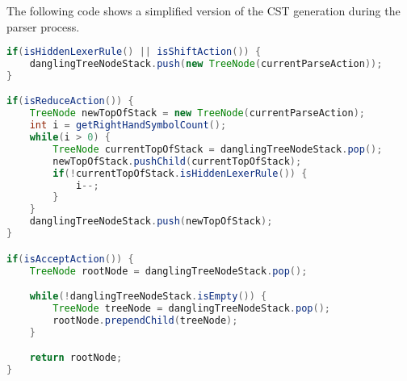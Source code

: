 The following code shows a simplified version of the CST generation during the parser process.
\begin{lstlisting}[language=Java, caption=CST Generation]
if(isHiddenLexerRule() || isShiftAction()) {
    danglingTreeNodeStack.push(new TreeNode(currentParseAction));
} 

if(isReduceAction()) {
    TreeNode newTopOfStack = new TreeNode(currentParseAction);
    int i = getRightHandSymbolCount();
    while(i > 0) {
        TreeNode currentTopOfStack = danglingTreeNodeStack.pop();
        newTopOfStack.pushChild(currentTopOfStack);
        if(!currentTopOfStack.isHiddenLexerRule()) {
            i--;
        }
    }
    danglingTreeNodeStack.push(newTopOfStack);
}

if(isAcceptAction()) {
    TreeNode rootNode = danglingTreeNodeStack.pop();

    while(!danglingTreeNodeStack.isEmpty()) {
        TreeNode treeNode = danglingTreeNodeStack.pop();
        rootNode.prependChild(treeNode);
    }

    return rootNode;
}
\end{lstlisting}

